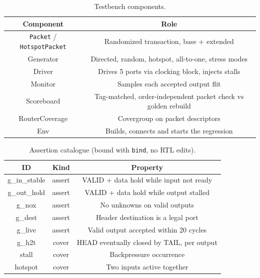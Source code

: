 \documentclass[11pt,a4paper]{report}  %
\begin{document}
\begin{table}[h!]
\centering
\caption{Testbench components.}
\vspace{2mm}
\begin{tabular}{|c|c|}
\hline
\textbf{Component} & \textbf{Role} \\ \hline
\texttt{Packet} / \texttt{HotspotPacket} & Randomized transaction, base + extended \\ \hline
Generator & Directed, random, hotspot, all-to-one, stress modes \\ \hline
Driver & Drives 5 ports via clocking block, injects stalls \\ \hline
Monitor & Samples each accepted output flit \\ \hline
Scoreboard & Tag-matched, order-independent packet check vs golden rebuild \\ \hline
RouterCoverage & Covergroup on packet descriptors \\ \hline
Env & Builds, connects and starts the regression \\ \hline
\end{tabular}
\label{tab:tbcomp}
\end{table}

\begin{table}[h!]
\centering
\caption{Assertion catalogue (bound with \texttt{bind}, no RTL edits).}
\vspace{2mm}
\begin{tabular}{|c|c|c|}
\hline
\textbf{ID} & \textbf{Kind} & \textbf{Property} \\ \hline
g\_in\_stable & assert & VALID + data hold while input not ready \\ \hline
g\_out\_hold & assert & VALID + data hold while output stalled \\ \hline
g\_nox & assert & No unknowns on valid outputs \\ \hline
g\_dest & assert & Header destination is a legal port \\ \hline
g\_live & assert & Valid output accepted within 20 cycles \\ \hline
g\_h2t & cover & HEAD eventually closed by TAIL, per output \\ \hline
stall & cover & Backpressure occurrence \\ \hline
hotspot & cover & Two inputs active together \\ \hline
\end{tabular}
\label{tab:sva}
\end{table}
\end{document}
